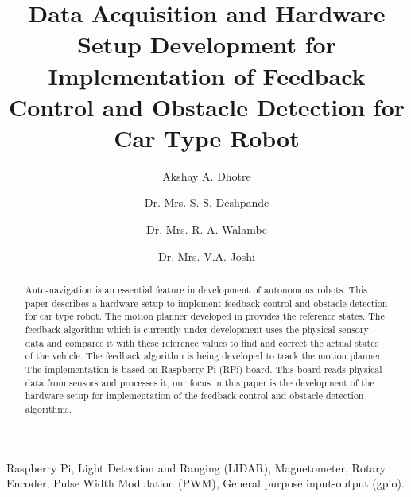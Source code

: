 \documentclass[conference]{IEEEtran}
\begin{document}
\title{Data Acquisition and Hardware Setup Development for Implementation of Feedback Control and Obstacle Detection for Car Type Robot}


\author{Akshay A. Dhotre}
 


\author{Dr. Mrs. S. S. Deshpande}
 
\author{Dr. Mrs. R. A. Walambe}


\author{Dr. Mrs. V.A. Joshi}



\renewcommand\Authands{ and }

\maketitle


\begin{abstract}
	Auto-navigation is an essential feature in development of autonomous robots.
	This paper describes a hardware setup to implement feedback control and obstacle detection for car type robot. The motion planner developed in \cite{paper1} \cite{paper2} provides the reference states. The feedback algorithm which is currently under development uses the physical sensory data and compares it with these reference values to find and correct the actual states of the vehicle. The feedback algorithm is being developed to track the motion planner. The implementation is based on Raspberry Pi (RPi) board. 
	This board reads physical data from sensors and processes it, our focus in this paper is the development of the hardware setup for implementation of the feedback control and obstacle detection algorithms.
\end{abstract}


\begin{IEEEkeywords}
Raspberry Pi, Light Detection and Ranging (LIDAR), Magnetometer, Rotary Encoder, Pulse Width Modulation (PWM), General purpose input-output (gpio).
\end{IEEEkeywords}
\end{document}
